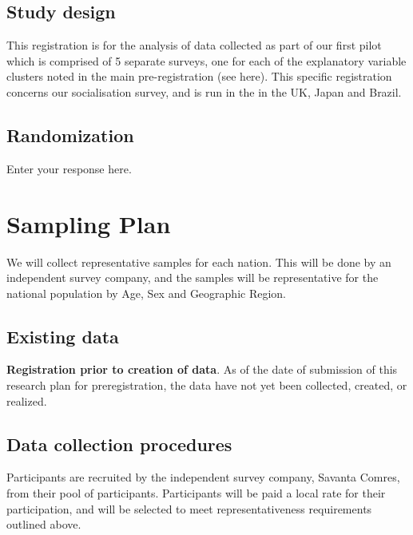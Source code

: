 \documentclass[]{article}
\begin{document}
\hypertarget{study-design}{%
\subsection{Study design}\label{study-design}}

This registration is for the analysis of data collected as part of our
first pilot which is comprised of 5 separate surveys, one for each of
the explanatory variable clusters noted in the main pre-registration
(see here). This specific registration concerns our socialisation
survey, and is run in the in the UK, Japan and Brazil.

\hypertarget{randomization}{%
\subsection{Randomization}\label{randomization}}

Enter your response here.

\hypertarget{sampling-plan}{%
\section{Sampling Plan}\label{sampling-plan}}

We will collect representative samples for each nation. This will be
done by an independent survey company, and the samples will be
representative for the national population by Age, Sex and Geographic
Region.

\hypertarget{existing-data}{%
\subsection{Existing data}\label{existing-data}}

\textbf{Registration prior to creation of data}. As of the date of
submission of this research plan for preregistration, the data have not
yet been collected, created, or realized.

\hypertarget{data-collection-procedures}{%
\subsection{Data collection
procedures}\label{data-collection-procedures}}

Participants are recruited by the independent survey company, Savanta
Comres, from their pool of participants. Participants will be paid a
local rate for their participation, and will be selected to meet
representativeness requirements outlined above.
\end{document}
